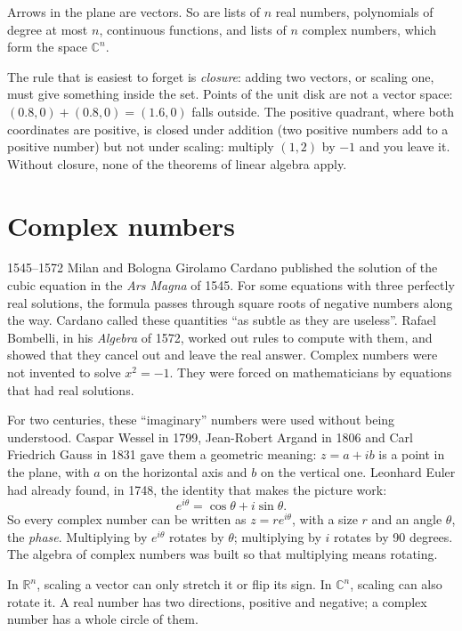 Arrows in the plane are vectors. So are lists of $n$ real numbers, polynomials of
degree at most $n$, continuous functions, and lists of $n$ complex numbers, which
form the space $\mathbb{C}^n$.

The rule that is easiest to forget is \emph{closure}: adding two vectors, or
scaling one, must give something inside the set. Points of the unit disk are not
a vector space: $(0.8, 0) + (0.8, 0) = (1.6, 0)$ falls outside. The positive
quadrant, where both coordinates are positive, is closed under addition (two
positive numbers add to a positive number) but not under scaling: multiply
$(1, 2)$ by $-1$ and you leave it. Without closure, none of the theorems of linear
algebra apply.

\section{Complex numbers}

\begin{history}{1545--1572 \textperiodcentered{} Milan and Bologna}
Girolamo Cardano published the solution of the cubic equation in the \emph{Ars
Magna} of 1545. For some equations with three perfectly real solutions, the
formula passes through square roots of negative numbers along the way. Cardano
called these quantities ``as subtle as they are useless''. Rafael Bombelli, in his
\emph{Algebra} of 1572, worked out rules to compute with them, and showed that
they cancel out and leave the real answer. Complex numbers were not invented to
solve $x^2 = -1$. They were forced on mathematicians by equations that had real
solutions.
\end{history}

For two centuries, these ``imaginary'' numbers were used without being
understood. Caspar Wessel in 1799, Jean-Robert Argand in 1806 and Carl Friedrich
Gauss in 1831 gave them a geometric meaning: $z = a + ib$ is a point in the plane,
with $a$ on the horizontal axis and $b$ on the vertical one. Leonhard Euler had
already found, in 1748, the identity that makes the picture work:
\[
  e^{i\theta} = \cos\theta + i\sin\theta .
\]
So every complex number can be written as $z = re^{i\theta}$, with a size $r$ and
an angle $\theta$, the \emph{phase}. Multiplying by $e^{i\theta}$ rotates by
$\theta$; multiplying by $i$ rotates by 90 degrees. The algebra of complex numbers
was built so that multiplying means rotating.

In $\mathbb{R}^n$, scaling a vector can only stretch it or flip its sign. In
$\mathbb{C}^n$, scaling can also rotate it. A real number has two directions,
positive and negative; a complex number has a whole circle of them.

